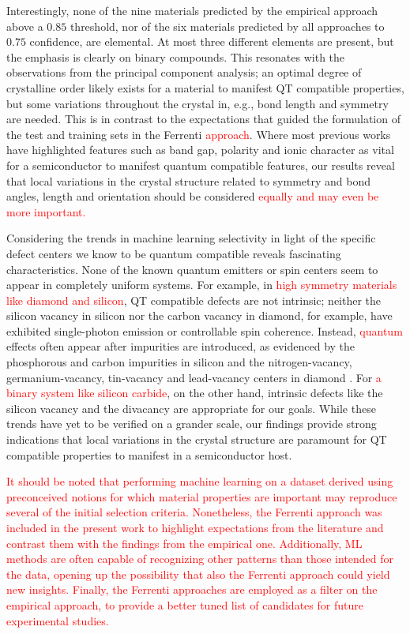 \documentclass[superscriptaddress,unsortedaddress,
 amsmath,amssymb,
 aps,
]{revtex4-2}
\newcommand{\mrk}[1]{\textcolor{red}{#1}}
\begin{document}
Interestingly, none of the nine materials predicted by the empirical approach above a $0.85$ threshold, nor of the six materials predicted by all approaches to $0.75$ confidence, are elemental. At most three different elements are present, but the emphasis is clearly on binary compounds. This resonates with the observations from the principal component analysis; an optimal degree of crystalline order likely exists for a material to manifest QT compatible properties, but some variations throughout the crystal in, e.g., bond length and symmetry are needed. This is in contrast to the expectations that guided the formulation of the test and training sets in the Ferrenti \mrk{approach}. Where most previous works have highlighted features such as band gap, polarity and ionic character as vital for a semiconductor to manifest quantum compatible features, our results reveal that local variations in the crystal structure related to symmetry and bond angles, length and orientation should be considered \mrk{equally and may even be more important.} 

Considering the trends in machine learning selectivity in light of the specific defect centers we know to be quantum compatible reveals fascinating characteristics. None of the known quantum emitters or spin centers seem to appear in completely uniform systems. For example, in \mrk{high symmetry materials like diamond and silicon}, QT compatible defects are not intrinsic; neither the silicon vacancy in silicon nor the carbon vacancy in diamond, for example,  have exhibited single-photon emission or controllable spin coherence. Instead, \mrk{quantum} effects often appear after impurities are introduced, as evidenced by the phosphorous and carbon impurities in silicon \cite{He2019,Redjem2020} and the nitrogen-vacancy, germanium-vacancy, tin-vacancy and lead-vacancy centers in diamond \cite{Thiering2020}. 
For \mrk{a binary system like silicon carbide}, on the other hand, intrinsic defects like the silicon vacancy and the divacancy are appropriate for our goals. 
While these trends have yet to be verified on a grander scale, our findings provide strong indications that local variations in the crystal structure are paramount for QT compatible properties to manifest in a semiconductor host. 

\mrk{It should be noted that performing machine learning on a dataset derived using preconceived notions for which material properties are important may reproduce several of the initial selection criteria. Nonetheless, the Ferrenti approach was included in the present work to highlight expectations from the literature and contrast them with the findings from the empirical one. Additionally, ML methods are often capable of recognizing other patterns than those intended for the data, opening up the possibility that also the Ferrenti approach could yield new insights. Finally, the Ferrenti approaches are employed as a filter on the empirical approach, to provide a better tuned list of candidates for future experimental studies.} 
\end{document}
